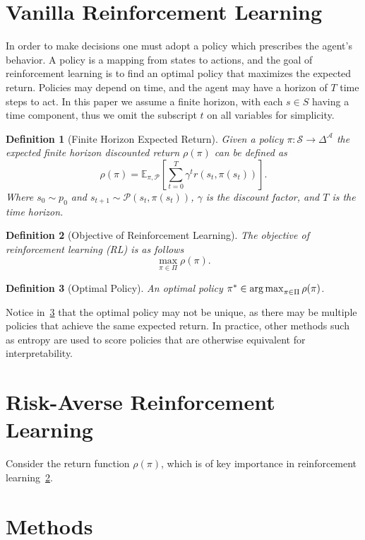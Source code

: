 \documentclass[10pt]{article}
\newtheorem{definition}{Definition}
\theoremstyle{plain}
\theoremstyle{remark}
\begin{document}
\section{Vanilla Reinforcement Learning}

In order to make decisions one must adopt a policy which prescribes the agent's behavior.
A policy is a mapping from states to actions, and the goal of reinforcement learning is to find an optimal policy that maximizes the expected return.
Policies may depend on time, and the agent may have a horizon of $T$ time steps to act. 
In this paper we assume a finite horizon, with each $s \in S$ having a time component, thus we omit the subscript $t$ on all variables for simplicity.

\begin{definition}[Finite Horizon Expected Return]
        Given a policy $\pi : \mathcal{S} \to \Delta^\mathcal{A}$ the expected finite horizon discounted return $\rho(\pi)$ can be defined as
        $$\rho(\pi) = \mathbb{E}_{\pi, \mathcal{P}} \left[ \sum_{t=0}^{T} \gamma^t r(s_t, \pi(s_t)) \right].$$
        Where $s_0 \sim p_0$ and $s_{t+1} \sim \mathcal{P}(s_t, \pi(s_t))$, $\gamma$ is the discount factor, and $T$ is the time horizon.
\end{definition}

\begin{definition}[Objective of Reinforcement Learning]\label{def:rl_obj}
        The objective of reinforcement learning (RL) is as follows
        \[
        \max_{\pi \in \Pi} \rho(\pi). 
        \]
\end{definition}

\begin{definition}[Optimal Policy]\label{def:optimal_policy}
        An optimal policy $\pi^* \in \operatorname*{arg\,max}_{\pi \in \Pi} \rho(\pi)$.
\end{definition}

Notice in~\ref{def:optimal_policy} that the optimal policy may not be unique, as there may be multiple policies that achieve the same expected return. 
In practice, other methods such as entropy are used to score policies that are otherwise equivalent for interpretability.


\section{Risk-Averse Reinforcement Learning}

Consider the return function $\rho(\pi)$, which is of key importance in reinforcement learning~\ref{def:rl_obj}.

\section{Methods}


\end{document}
